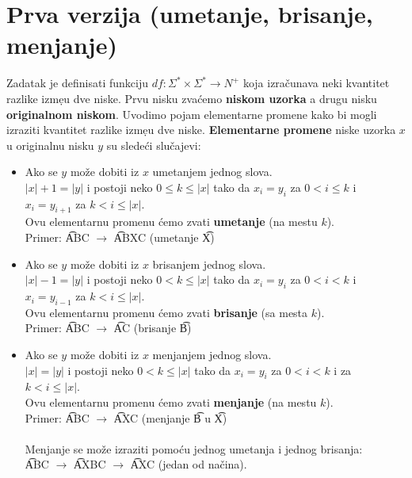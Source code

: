   \section{Prva verzija (umetanje, brisanje, menjanje)}
    Zadatak je definisati funkciju $df\colon\Sigma^*\times\Sigma^*\to N^+$
    koja izra\v{c}unava neki kva\-ntitet razlike izme{\d}u dve niske.
    Prvu nisku zva\'cemo {\bf niskom uzorka} a drugu nisku
    {\bf originalnom niskom}.
    Uvodimo pojam elementarne promene kako bi mogli izraziti kvantitet
    razlike izme{\d}u dve niske.
    {\bf Elementarne promene} niske uzorka $x$ u originalnu nisku $y$ su
    slede\'ci slu\v{c}ajevi:
    \begin{itemize}
      \item
        Ako se $y$ mo\v{z}e dobiti iz $x$ umetanjem jednog slova.\\
        $|x|+1=|y|$ i postoji neko $0\le k\le |x|$ tako da $x_i=y_i$ za
        $0<i\le k$ i $x_i=y_{i+1}$ za $k< i\le|x|$.\\
        Ovu elementarnu promenu \'cemo zvati {\bf umetanje} (na mestu $k$).
        \\
        Primer: \t{ABC} $\longrightarrow$ \t{ABXC} (umetanje \t{X})
      \item
        Ako se $y$ mo\v{z}e dobiti iz $x$ brisanjem jednog slova.\\
        $|x|-1=|y|$ i postoji neko $0< k\le|x|$ tako da $x_i=y_i$ za
        $0<i<k$ i $x_i=y_{i-1}$ za $k<i\le|x|$.\\
        Ovu elementarnu promenu \'cemo zvati {\bf brisanje} (sa mesta $k$).
        \\
        Primer: \t{ABC} $\longrightarrow$ \t{AC} (brisanje \t{B})
      \item
        Ako se $y$ mo\v{z}e dobiti iz $x$ menjanjem jednog slova.\\
        $|x|=|y|$ i postoji neko $0<k\le|x|$ tako da $x_i=y_i$ za
        $0<i<k$ i za $k<i\le|x|$.\\
        Ovu elementarnu promenu \'cemo zvati {\bf menjanje} (na mestu $k$).
        \\
        Primer: \t{ABC} $\longrightarrow$ \t{AXC} (menjanje \t{B} u \t{X})\\
        \\
        Menjanje se mo\v{z}e izraziti pomo\'cu jednog umetanja i jednog
        brisanja:\\
        \t{ABC} $\longrightarrow$ \t{AXBC} $\longrightarrow$ \t{AXC}
        (jedan od na\v{c}ina).
    \end{itemize}
